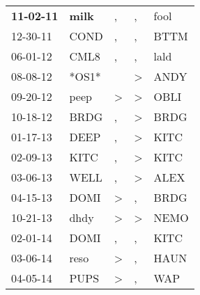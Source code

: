 \begin{supertabular}{p{0.07\textwidth}p{0.06\textwidth}p{0.02\textwidth}p{0.02\textwidth}p{0.06\textwidth}}
 \textbf{11-02-11\textsuperscript{}} &  \textbf{milk\textsuperscript{}} &                , &                , &           fool\textsuperscript{} \\
          12-30-11\textsuperscript{} &           COND\textsuperscript{} &                , &                , &           BTTM\textsuperscript{} \\
          06-01-12\textsuperscript{} &           CML8\textsuperscript{} &                , &                , &           lald\textsuperscript{} \\
          08-08-12\textsuperscript{} &                            *OS1* &                  &     \textgreater &           ANDY\textsuperscript{} \\
          09-20-12\textsuperscript{} &           peep\textsuperscript{} &     \textgreater &     \textgreater &           OBLI\textsuperscript{} \\
          10-18-12\textsuperscript{} &           BRDG\textsuperscript{} &                , &     \textgreater &           BRDG\textsuperscript{} \\
          01-17-13\textsuperscript{} &           DEEP\textsuperscript{} &                , &     \textgreater &           KITC\textsuperscript{} \\
          02-09-13\textsuperscript{} &           KITC\textsuperscript{} &                , &     \textgreater &           KITC\textsuperscript{} \\
          03-06-13\textsuperscript{} &           WELL\textsuperscript{} &                , &     \textgreater &           ALEX\textsuperscript{} \\
          04-15-13\textsuperscript{} &           DOMI\textsuperscript{} &     \textgreater &                , &           BRDG\textsuperscript{} \\
          10-21-13\textsuperscript{} &           dhdy\textsuperscript{} &     \textgreater &     \textgreater &           NEMO\textsuperscript{} \\
          02-01-14\textsuperscript{} &           DOMI\textsuperscript{} &                , &                , &           KITC\textsuperscript{} \\
          03-06-14\textsuperscript{} &           reso\textsuperscript{} &     \textgreater &                , &           HAUN\textsuperscript{} \\
          04-05-14\textsuperscript{} &           PUPS\textsuperscript{} &     \textgreater &                , &            WAP\textsuperscript{} \\

\end{supertabular}
